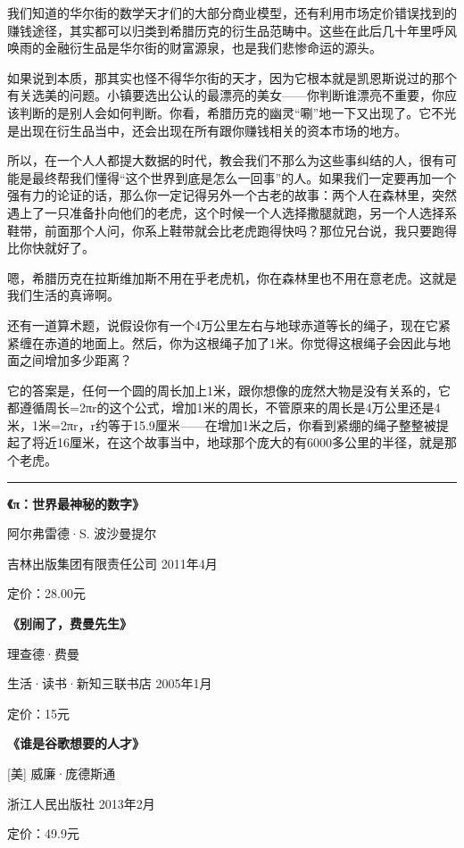 我们知道的华尔街的数学天才们的大部分商业模型，还有利用市场定价错误找到的赚钱途径，其实都可以归类到希腊历克的衍生品范畴中。这些在此后几十年里呼风唤雨的金融衍生品是华尔街的财富源泉，也是我们悲惨命运的源头。

如果说到本质，那其实也怪不得华尔街的天才，因为它根本就是凯恩斯说过的那个有关选美的问题。小镇要选出公认的最漂亮的美女------你判断谁漂亮不重要，你应该判断的是别人会如何判断。你看，希腊历克的幽灵``唰''地一下又出现了。它不光是出现在衍生品当中，还会出现在所有跟你赚钱相关的资本市场的地方。

所以，在一个人人都提大数据的时代，教会我们不那么为这些事纠结的人，很有可能是最终帮我们懂得``这个世界到底是怎么一回事''的人。如果我们一定要再加一个强有力的论证的话，那么你一定记得另外一个古老的故事：两个人在森林里，突然遇上了一只准备扑向他们的老虎，这个时候一个人选择撒腿就跑，另一个人选择系鞋带，前面那个人问，你系上鞋带就会比老虎跑得快吗？那位兄台说，我只要跑得比你快就好了。

嗯，希腊历克在拉斯维加斯不用在乎老虎机，你在森林里也不用在意老虎。这就是我们生活的真谛啊。

还有一道算术题，说假设你有一个4万公里左右与地球赤道等长的绳子，现在它紧紧缠在赤道的地面上。然后，你为这根绳子加了1米。你觉得这根绳子会因此与地面之间增加多少距离？

它的答案是，任何一个圆的周长加上1米，跟你想像的庞然大物是没有关系的，它都遵循周长=2πr的这个公式，增加1米的周长，不管原来的周长是4万公里还是4米，1米=2πr，r约等于15.9厘米------在增加1米之后，你看到紧绷的绳子整整被提起了将近16厘米，在这个故事当中，地球那个庞大的有6000多公里的半径，就是那个老虎。

\begin{center}\rule{0.5\linewidth}{0.5pt}\end{center}

\textbf{《π：世界最神秘的数字》}

阿尔弗雷德·S. 波沙曼提尔

吉林出版集团有限责任公司 2011年4月

定价：28.00元

\textbf{《别闹了，费曼先生》}

理查德·费曼

生活·读书·新知三联书店 2005年1月

定价：15元

\textbf{《谁是谷歌想要的人才》}

{[}美{]} 威廉·庞德斯通

浙江人民出版社 2013年2月

定价：49.9元

